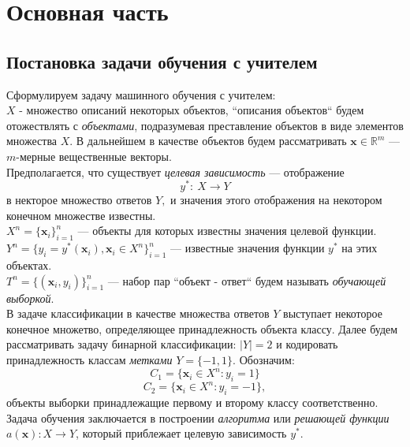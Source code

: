 \documentclass[%
bachelor,    %
subf,        %
href,        %
colorlinks,  %
]{disser}
\let\vec=\mathbf
\begin{document}
\section{Основная часть}
\subsection{Постановка задачи обучения с учителем}
Сформулируем задачу машинного обучения с учителем:\\
$X$ - множество описаний некоторых объектов, ``описания объектов`` будем отожествлять с \textit{объектами}, подразумевая преставление объектов в виде элементов множества $X$. В дальнейшем в качестве объектов будем рассматривать $\vec{x} \in \mathbb{R}^m$ --- $m$-мерные вещественные векторы.\\
Предполагается, что существует \textit{целевая зависимость} — отображение $$y^{*}:\: X\to Y$$ в некторое множество ответов $Y,$ и значения этого отображения на некотором конечном множестве известны.\\
$X^n = \{ \vec{x}_i \}_{i=1}^n$ --- объекты для которых известны значения целевой функции. $Y^n = \{y_i = y^{*}(\vec{x}_i), \vec{x}_i \in X^n \}_{i=1}^n$ --- известные значения функции $y^{*}$ на этих объектах.\\
$T^n=\{(\vec{x}_i,y_i)\}_{i=1}^n$ --- набор пар ``объект - ответ`` будем называть \textit{обучающей выборкой}.\\
В задаче классификации в качестве множества ответов $Y$ выступает некоторое конечное множетво, определяющее принадлежность объекта классу. Далее будем рассматривать задачу бинарной классификации: $|Y|=2$ и кодировать принадлежность классам \textit{метками} $Y=\{-1,1\}.$ Обозначим:
$$C_1 = \{\vec{x}_i \in X^n : y_i = 1\}$$
$$C_2 = \{\vec{x}_i \in X^n :y_i = -1\},$$
объекты выборки принадлежащие первому и второму классу соответственно.
Задача обучения заключается в построении \textit{алгоритма} или \textit{решающей функции}  $a(\vec{x}): X \to Y$, который приблежает целевую зависимость $y^{*}$.\cite{supervised_learning}
\end{document}
